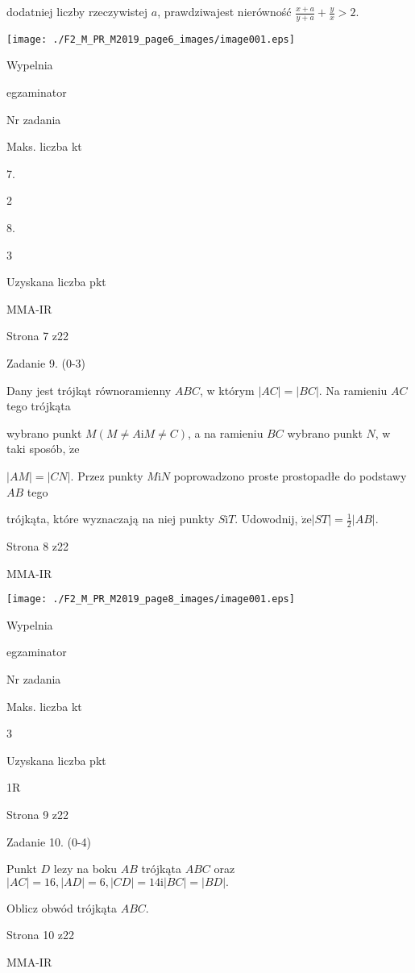 \documentclass[a4paper,12pt]{article}
\begin{document}
dodatniej liczby rzeczywistej $a$, prawdziwajest nierówność $\displaystyle \frac{x+a}{y+a}+\frac{y}{x}>2.$
\begin{center}
\texttt{[image: ./F2\_M\_PR\_M2019\_page6\_images/image001.eps]}
\end{center}
Wypelnia

egzaminator

Nr zadania

Maks. liczba kt

7.

2

8.

3

Uzyskana liczba pkt

MMA-IR

Strona 7 z22





Zadanie 9. (0-3)

Dany jest trójkąt równoramienny $ABC$, w którym $|AC|=|BC|$. Na ramieniu $AC$ tego trójkąta

wybrano punkt $M(M\neq A\mathrm{i}M\neq C)$, a na ramieniu $BC$ wybrano punkt $N$, w taki sposób, $\dot{\mathrm{z}}\mathrm{e}$

$|AM|=|CN|$. Przez punkty $M\mathrm{i}N$ poprowadzono proste prostopadłe do podstawy $AB$ tego

trójkąta, które wyznaczają na niej punkty $S\mathrm{i}T$. Udowodnij, $\displaystyle \dot{\mathrm{z}}\mathrm{e}|ST|=\frac{1}{2}|AB|.$

Strona 8 z22

MMA-IR




\begin{center}
\texttt{[image: ./F2\_M\_PR\_M2019\_page8\_images/image001.eps]}
\end{center}
Wypelnia

egzaminator

Nr zadania

Maks. liczba kt

3

Uzyskana liczba pkt

1R

Strona 9 z22





Zadanie 10. (0-4)

Punkt $D$ lezy na boku $AB$ trójkąta $ABC$ oraz $|AC|=16, |AD|=6, |CD|=14 \mathrm{i} |BC|=|BD|.$

Oblicz obwód trójkąta $ABC.$

Strona 10 z22

MMA-IR
\end{document}
